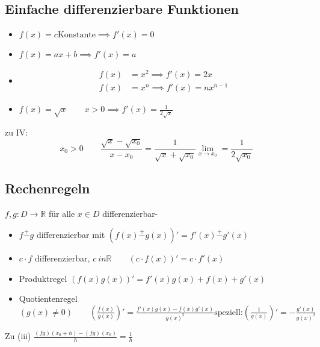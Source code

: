 \subsection{Einfache differenzierbare Funktionen}
\begin{itemize}
	\item \( f(x)=c \text{Konstante} \implies f'(x)=0 \)
	\item \( f(x)=ax+b \implies f'(x)=a \)
	\item \begin{align*}
			f(x)&=x^2 \implies f'(x)=2x \\
			f(x)&=x^n \implies f'(x)=nx^{n-1}
		\end{align*}
	\item \( f(x)=\sqrt{x} \qquad x>0 \implies f'(x)=\frac{1}{2\sqrt{x}} \)
\end{itemize}
zu IV:
\[
x_0>0 \qquad \frac{\sqrt{x}-\sqrt{x_0}}{x-x_0} =\frac{1}{\sqrt{x}+\sqrt{x_0}}\lim\limits_{x \rightarrow x_0}=\frac{1}{2\sqrt{x_0}}
\]

\subsection{Rechenregeln} %
\label{sub:rechenregeln}

\( f,g:D\rightarrow\mathbb{R} \) für alle \( x \in D \) differenzierbar-

\begin{itemize}
	\item \( f \stackrel{+}{-} g \) differenzierbar mit \( (f(x)\stackrel{+}{-}g(x))'=f'(x)\stackrel{+}{-}g'(x) \)
	\item \( c \cdot f \) differenzierbar, \( c \ in \mathbb{R} \qquad (c \cdot f(x))'=c\cdot f'(x) \)
	\item Produktregel \( (f(x)g(x))' = f'(x)g(x)+f(x)+g'(x) \)
	\item Quotientenregel \( (g(x) \neq 0) \qquad (\frac{f(x)}{g(x)})'=\frac{f'(x)g(x)-f(x)g'(x)}{g(x)^2} \text{speziell:} (\frac{1}{g(x)})'=-\frac{g'(x)}{g(x)^2}\)
\end{itemize}

Zu (iii) \( \frac{(fg)(x_0+h)-(fg)(x_0)}{h}=\frac{1}{h} \)
